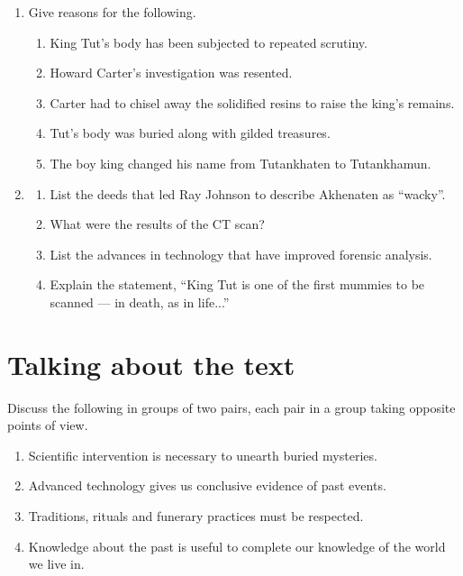 \begin{enumerate}[label=\arabic*., leftmargin=*]
    \item Give reasons for the following.
    \begin{enumerate}[label=(\roman*), leftmargin=2em]
        \item King Tut's body has been subjected to repeated scrutiny.
        \item Howard Carter's investigation was resented.
        \item Carter had to chisel away the solidified resins to raise the king's remains.
        \item Tut's body was buried along with gilded treasures.
        \item The boy king changed his name from Tutankhaten to Tutankhamun.
    \end{enumerate}
    
    \item 
    \begin{enumerate}[label=(\roman*), leftmargin=2em]
        \item List the deeds that led Ray Johnson to describe Akhenaten as ``wacky''.
        \item What were the results of the CT scan?
        \item List the advances in technology that have improved forensic analysis.
        \item Explain the statement, ``King Tut is one of the first mummies to be scanned --- in death, as in life...''
    \end{enumerate}
\end{enumerate}

\section*{Talking about the text}

\noindent Discuss the following in groups of two pairs, each pair in a group taking opposite points of view.

\begin{enumerate}[label=\arabic*., leftmargin=*]
    \item Scientific intervention is necessary to unearth buried mysteries.
    \item Advanced technology gives us conclusive evidence of past events.
    \item Traditions, rituals and funerary practices must be respected.
    \item Knowledge about the past is useful to complete our knowledge of the world we live in.
\end{enumerate}


